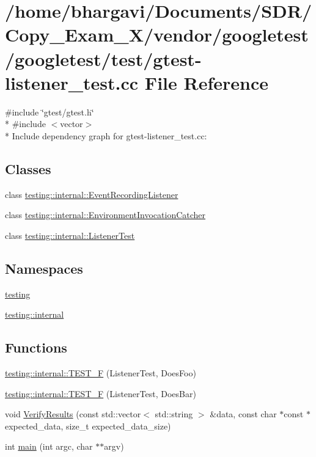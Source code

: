 \hypertarget{gtest-listener__test_8cc}{}\section{/home/bhargavi/\+Documents/\+S\+D\+R/\+Copy\+\_\+\+Exam\+\_\+X/vendor/googletest/googletest/test/gtest-\/listener\+\_\+test.cc File Reference}
\label{gtest-listener__test_8cc}
{\ttfamily \#include \char`\"{}gtest/gtest.\+h\char`\"{}}\\*
{\ttfamily \#include $<$vector$>$}\\*
Include dependency graph for gtest-\/listener\+\_\+test.cc\+:
\subsection*{Classes}
\begin{DoxyCompactItemize}
\item 
class \hyperlink{classtesting_1_1internal_1_1_event_recording_listener}{testing\+::internal\+::\+Event\+Recording\+Listener}
\item 
class \hyperlink{classtesting_1_1internal_1_1_environment_invocation_catcher}{testing\+::internal\+::\+Environment\+Invocation\+Catcher}
\item 
class \hyperlink{classtesting_1_1internal_1_1_listener_test}{testing\+::internal\+::\+Listener\+Test}
\end{DoxyCompactItemize}
\subsection*{Namespaces}
\begin{DoxyCompactItemize}
\item 
 \hyperlink{namespacetesting}{testing}
\item 
 \hyperlink{namespacetesting_1_1internal}{testing\+::internal}
\end{DoxyCompactItemize}
\subsection*{Functions}
\begin{DoxyCompactItemize}
\item 
\hyperlink{namespacetesting_1_1internal_a7e113e9c70d45d89fe1703e58ff083b9}{testing\+::internal\+::\+T\+E\+S\+T\+\_\+F} (Listener\+Test, Does\+Foo)
\item 
\hyperlink{namespacetesting_1_1internal_a02cef32090020d164460dd3d9f8e2852}{testing\+::internal\+::\+T\+E\+S\+T\+\_\+F} (Listener\+Test, Does\+Bar)
\item 
void \hyperlink{gtest-listener__test_8cc_ab9d583cd17d35925ad3d12f864d57fe9}{Verify\+Results} (const std\+::vector$<$ std\+::string $>$ \&data, const char $\ast$const $\ast$expected\+\_\+data, size\+\_\+t expected\+\_\+data\+\_\+size)
\item 
int \hyperlink{gtest-listener__test_8cc_a3c04138a5bfe5d72780bb7e82a18e627}{main} (int argc, char $\ast$$\ast$argv)
\end{DoxyCompactItemize}
